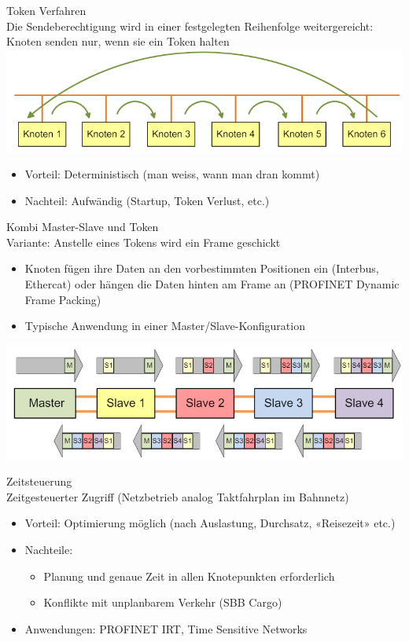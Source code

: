 \begin{definition}{Token Verfahren}\\
    Die Sendeberechtigung wird in einer festgelegten Reihenfolge weitergereicht: Knoten senden nur, wenn sie ein Token halten\\
        \includegraphics[width=0.75\linewidth]{images/token-verfahren.png}
    \begin{itemize}
        \item Vorteil:  Deterministisch (man weiss, wann man dran kommt)
        \item Nachteil: Aufwändig (Startup, Token Verlust, etc.)
    \end{itemize}
\end{definition}

\begin{concept}{Kombi Master-Slave und Token}\\
    Variante: Anstelle eines Tokens wird ein Frame geschickt
    \begin{itemize}
        \item Knoten fügen ihre Daten an den vorbestimmten Positionen ein (Interbus, Ethercat) oder hängen die Daten hinten am Frame an (PROFINET Dynamic Frame Packing)
        \item Typische Anwendung in einer Master/Slave-Konfiguration
    \end{itemize}
        \includegraphics[width=0.75\linewidth]{images/combo_master_slave_token.png}
\end{concept}

\begin{definition}{Zeitsteuerung}\\
    Zeitgesteuerter Zugriff (Netzbetrieb analog Taktfahrplan im Bahnnetz)
    \begin{itemize}
        \item Vorteil: Optimierung möglich (nach Auslastung, Durchsatz, «Reisezeit» etc.)
        \item Nachteile:
        \begin{itemize}
            \item Planung und genaue Zeit in allen Knotepunkten erforderlich
            \item Konflikte mit unplanbarem Verkehr (SBB Cargo)
        \end{itemize}
        \item Anwendungen: PROFINET IRT, Time Sensitive Networks
    \end{itemize}
\end{definition}

